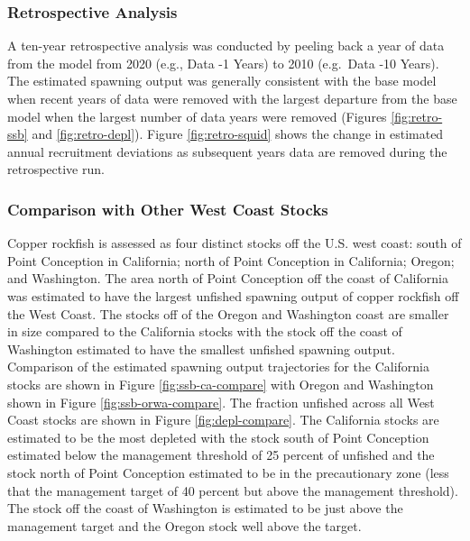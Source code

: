 \documentclass[11pt,
  english,
  a4paper,
]{article}
\begin{document}
\leavevmode\tagmcend\tagstructend\par


\hypertarget{retrospective-analysis}{%
\subsubsection{Retrospective Analysis}\label{retrospective-analysis}}

\leavevmode\tagmcend\tagstructend


A ten-year retrospective analysis was conducted by peeling back a year of data from the model from 2020 (e.g., Data -1 Years) to 2010 (e.g.~Data -10 Years). The estimated spawning output was generally consistent with the base model when recent years of data were removed with the largest departure from the base model when the largest number of data years were removed (Figures \ref{fig:retro-ssb} and \ref{fig:retro-depl}). Figure \ref{fig:retro-squid} shows the change in estimated annual recruitment deviations as subsequent years data are removed during the retrospective run.

\leavevmode\tagmcend\tagstructend\par


\hypertarget{comparison-with-other-west-coast-stocks}{%
\subsubsection{Comparison with Other West Coast Stocks}\label{comparison-with-other-west-coast-stocks}}

\leavevmode\tagmcend\tagstructend


Copper rockfish is assessed as four distinct stocks off the U.S. west coast: south of Point Conception in California; north of Point Conception in California; Oregon; and Washington. The area north of Point Conception off the coast of California was estimated to have the largest unfished spawning output of copper rockfish off the West Coast. The stocks off of the Oregon and Washington coast are smaller in size compared to the California stocks with the stock off the coast of Washington estimated to have the smallest unfished spawning output. Comparison of the estimated spawning output trajectories for the California stocks are shown in Figure \ref{fig:ssb-ca-compare} with Oregon and Washington shown in Figure \ref{fig:ssb-orwa-compare}. The fraction unfished across all West Coast stocks are shown in Figure \ref{fig:depl-compare}. The California stocks are estimated to be the most depleted with the stock south of Point Conception estimated below the management threshold of 25 percent of unfished and the stock north of Point Conception estimated to be in the precautionary zone (less that the management target of 40 percent but above the management threshold). The stock off the coast of Washington is estimated to be just above the management target and the Oregon stock well above the target.
\end{document}
